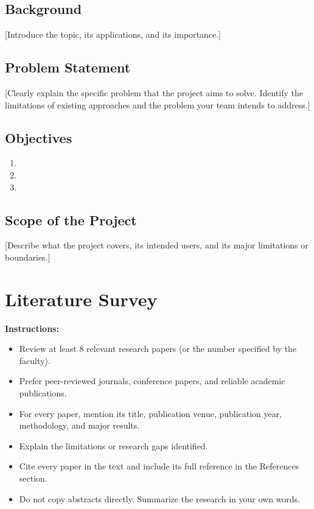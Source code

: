 \documentclass[12pt,a4paper]{report}
\begin{document}
\section{Background}

[Introduce the topic, its applications, and its importance.]

\section{Problem Statement}

[Clearly explain the specific problem that the project
aims to solve. Identify the limitations of existing
approaches and the problem your team intends to address.]

\section{Objectives}

\begin{enumerate}
    \item [Objective 1]
    \item [Objective 2]
    \item [Objective 3]
\end{enumerate}

\section{Scope of the Project}

[Describe what the project covers, its intended users,
and its major limitations or boundaries.]

\chapter{Literature Survey}

\textbf{Instructions:}
\begin{itemize}
    \item Review at least 8 relevant research papers
    (or the number specified by the faculty).
    \item Prefer peer-reviewed journals, conference papers,
    and reliable academic publications.
    \item For every paper, mention its title, publication
    venue, publication year, methodology, and major results.
    \item Explain the limitations or research gaps identified.
    \item Cite every paper in the text and include its full
    reference in the References section.
    \item Do not copy abstracts directly. Summarize the
    research in your own words.
\end{itemize}
\end{document}
